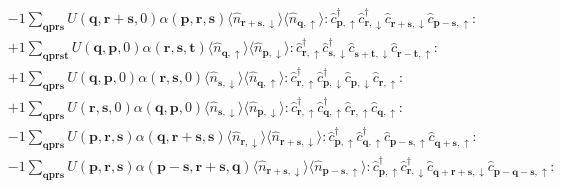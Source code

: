 \begin{align*}
	&-1 \sum_{ \mathbf{q} \mathbf{p} \mathbf{r} \mathbf{s} } U( \mathbf{q}, \mathbf{r}+\mathbf{s}, 0 )  \alpha( \mathbf{p}, \mathbf{r}, \mathbf{s} )   \langle \hat{n}_{ \mathbf{r}+\mathbf{s}, \downarrow } \rangle \langle \hat{n}_{ \mathbf{q}, \uparrow } \rangle :\hat{c}_{ \mathbf{p}, \uparrow }^\dagger \hat{c}_{ \mathbf{r}, \downarrow }^\dagger \hat{c}_{ \mathbf{r}+\mathbf{s}, \downarrow }^{\phantom{\dagger}}\hat{c}_{ \mathbf{p}-\mathbf{s}, \uparrow }^{\phantom{\dagger}}: \\
	&+1 \sum_{ \mathbf{q} \mathbf{p} \mathbf{r} \mathbf{s} \mathbf{t} } U( \mathbf{q}, \mathbf{p}, 0 )  \alpha( \mathbf{r}, \mathbf{s}, \mathbf{t} )   \langle \hat{n}_{ \mathbf{q}, \uparrow } \rangle \langle \hat{n}_{ \mathbf{p}, \downarrow } \rangle :\hat{c}_{ \mathbf{r}, \uparrow }^\dagger \hat{c}_{ \mathbf{s}, \downarrow }^\dagger \hat{c}_{ \mathbf{s}+\mathbf{t}, \downarrow }^{\phantom{\dagger}}\hat{c}_{ \mathbf{r}-\mathbf{t}, \uparrow }^{\phantom{\dagger}}: \\
	&+1 \sum_{ \mathbf{q} \mathbf{p} \mathbf{r} \mathbf{s} } U( \mathbf{q}, \mathbf{p}, 0 )  \alpha( \mathbf{r}, \mathbf{s}, 0 )   \langle \hat{n}_{ \mathbf{s}, \downarrow } \rangle \langle \hat{n}_{ \mathbf{q}, \uparrow } \rangle :\hat{c}_{ \mathbf{r}, \uparrow }^\dagger \hat{c}_{ \mathbf{p}, \downarrow }^\dagger \hat{c}_{ \mathbf{p}, \downarrow }^{\phantom{\dagger}}\hat{c}_{ \mathbf{r}, \uparrow }^{\phantom{\dagger}}: \\
	&+1 \sum_{ \mathbf{q} \mathbf{p} \mathbf{r} \mathbf{s} } U( \mathbf{r}, \mathbf{s}, 0 )  \alpha( \mathbf{q}, \mathbf{p}, 0 )   \langle \hat{n}_{ \mathbf{s}, \downarrow } \rangle \langle \hat{n}_{ \mathbf{p}, \downarrow } \rangle :\hat{c}_{ \mathbf{r}, \uparrow }^\dagger \hat{c}_{ \mathbf{q}, \uparrow }^\dagger \hat{c}_{ \mathbf{r}, \uparrow }^{\phantom{\dagger}}\hat{c}_{ \mathbf{q}, \uparrow }^{\phantom{\dagger}}: \\
	&-1 \sum_{ \mathbf{q} \mathbf{p} \mathbf{r} \mathbf{s} } U( \mathbf{p}, \mathbf{r}, \mathbf{s} )  \alpha( \mathbf{q}, \mathbf{r}+\mathbf{s}, \mathbf{s} )   \langle \hat{n}_{ \mathbf{r}, \downarrow } \rangle \langle \hat{n}_{ \mathbf{r}+\mathbf{s}, \downarrow } \rangle :\hat{c}_{ \mathbf{p}, \uparrow }^\dagger \hat{c}_{ \mathbf{q}, \uparrow }^\dagger \hat{c}_{ \mathbf{p}-\mathbf{s}, \uparrow }^{\phantom{\dagger}}\hat{c}_{ \mathbf{q}+\mathbf{s}, \uparrow }^{\phantom{\dagger}}: \\
	&-1 \sum_{ \mathbf{q} \mathbf{p} \mathbf{r} \mathbf{s} } U( \mathbf{p}, \mathbf{r}, \mathbf{s} )  \alpha( \mathbf{p}-\mathbf{s}, \mathbf{r}+\mathbf{s}, \mathbf{q} )   \langle \hat{n}_{ \mathbf{r}+\mathbf{s}, \downarrow } \rangle \langle \hat{n}_{ \mathbf{p}-\mathbf{s}, \uparrow } \rangle :\hat{c}_{ \mathbf{p}, \uparrow }^\dagger \hat{c}_{ \mathbf{r}, \downarrow }^\dagger \hat{c}_{ \mathbf{q}+\mathbf{r}+\mathbf{s}, \downarrow }^{\phantom{\dagger}}\hat{c}_{ \mathbf{p}-\mathbf{q}-\mathbf{s}, \uparrow }^{\phantom{\dagger}}: \\

\end{align*}
